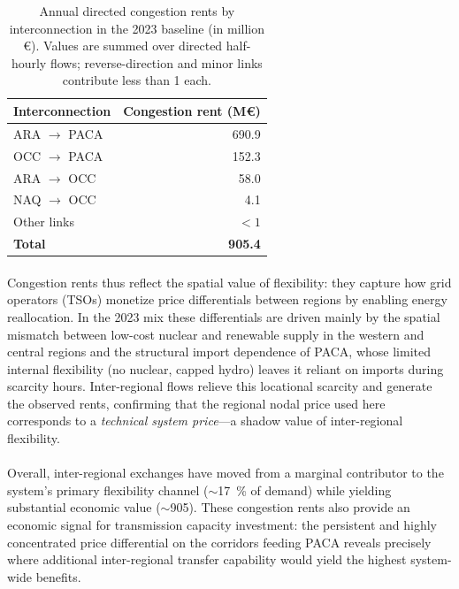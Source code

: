 \documentclass[12pt]{article}
\begin{document}
\begin{table}[h]
  \centering
  \begin{tabular}{l r}
  \hline
  Interconnection & Congestion rent (M€) \\
  \hline
  ARA $\to$ PACA & 690.9 \\
  OCC $\to$ PACA & 152.3 \\
  ARA $\to$ OCC  & 58.0 \\
  NAQ $\to$ OCC  & 4.1 \\
  Other links    & $<1$ \\
  \hline
  \textbf{Total} & \textbf{905.4} \\
  \hline
  \end{tabular}
  \caption{Annual directed congestion rents by interconnection in the 2023 baseline (in million €). Values are summed over directed half-hourly flows; reverse-direction and minor links contribute less than \SI{1}{\MEUR} each.}
  \label{tab:congestion_rents}
\end{table}

\paragraph{}
Congestion rents thus reflect the spatial value of flexibility: they capture how grid operators (TSOs) monetize price differentials between regions by enabling energy reallocation. In the 2023 mix these differentials are driven mainly by the spatial mismatch between low-cost nuclear and renewable supply in the western and central regions and the structural import dependence of PACA, whose limited internal flexibility (no nuclear, capped hydro) leaves it reliant on imports during scarcity hours. Inter-regional flows relieve this locational scarcity and generate the observed rents, confirming that the regional nodal price used here corresponds to a \emph{technical system price}---a shadow value of inter-regional flexibility.

\paragraph{}
Overall, inter-regional exchanges have moved from a marginal contributor to the system's primary flexibility channel (\(\sim\)\SI{17}{\percent} of demand) while yielding substantial economic value (\(\sim\)\SI{905}{\MEUR}). These congestion rents also provide an economic signal for transmission capacity investment: the persistent and highly concentrated price differential on the corridors feeding PACA reveals precisely where additional inter-regional transfer capability would yield the highest system-wide benefits.
\end{document}
